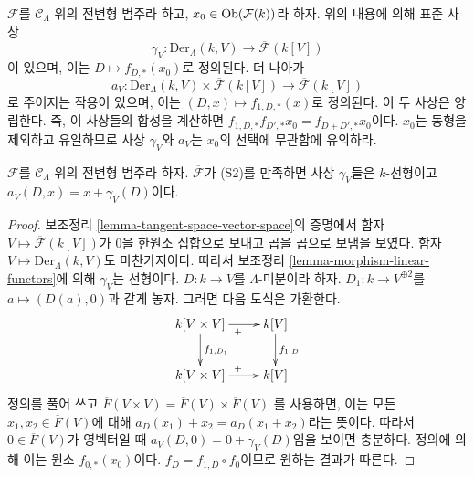 \medskip\noindent
$\mathcal{F}$를 $\mathcal{C}_\Lambda$ 위의 전변형 범주라 하고,
$x_0 \in \mathop{\mathrm{Ob}}\nolimits(\mathcal{F}(k))$라 하자. 위의 내용에 의해 표준 사상
$$
\gamma_V :
\text{Der}_\Lambda(k, V)
\longrightarrow
\overline{\mathcal{F}}(k[V])
$$
이 있으며, 이는 $D \mapsto f_{D, *}(x_0)$로 정의된다.
더 나아가
$$
a_V : \text{Der}_\Lambda(k, V) \times \overline{\mathcal{F}}(k[V])
\longrightarrow
\overline{\mathcal{F}}(k[V])
$$
로 주어지는 작용이 있으며, 이는
$(D, x) \mapsto f_{1, D, *}(x)$로 정의된다. 이 두 사상은
양립한다. 즉, 이 사상들의 합성을 계산하면
$f_{1, D, *}f_{D', *}x_0 = f_{D + D', *}x_0$이다.
$x_0$는 동형을 제외하고 유일하므로 사상 $\gamma_V$와
$a_V$는 $x_0$의 선택에 무관함에 유의하라.

\begin{lemma}
\label{lemma-action-linear}
$\mathcal{F}$를 $\mathcal{C}_\Lambda$ 위의 전변형 범주라 하자.
$\overline{\mathcal{F}}$가 (S2)를 만족하면 사상 $\gamma_V$들은
$k$-선형이고 $a_V(D, x) = x + \gamma_V(D)$이다.
\end{lemma}

\begin{proof}
보조정리 \ref{lemma-tangent-space-vector-space}의 증명에서
함자 $V \mapsto \overline{\mathcal{F}}(k[V])$가 $0$을 한원소
집합으로 보내고 곱을 곱으로 보냄을 보였다.
함자 $V \mapsto \text{Der}_\Lambda(k, V)$도 마찬가지이다.
따라서 보조정리 \ref{lemma-morphism-linear-functors}에 의해
$\gamma_V$는 선형이다.
$D : k \to V$를 $\Lambda$-미분이라 하자.
$D_1 : k \to V^{\oplus 2}$를 $a \mapsto (D(a), 0)$과 같게 놓자.
그러면 다음 도식은 가환한다.
$$
\xymatrix{
k[V \times V] \ar[r]_{+} \ar[d]^{f_{1, D_1}} & k[V] \ar[d]^{f_{1, D}} \\
k[V \times V] \ar[r]^{+} & k[V]
}
$$
정의를 풀어 쓰고
$\overline{F}(V \times V) = \overline{F}(V) \times \overline{F}(V)$
를 사용하면, 이는 모든
$x_1, x_2 \in \overline{F}(V)$에 대해
$a_D(x_1) + x_2 = a_D(x_1 + x_2)$라는 뜻이다.
따라서 $0 \in \overline{F}(V)$가 영벡터일 때
$a_V(D, 0) = 0 + \gamma_V(D)$임을 보이면 충분하다.
정의에 의해 이는 원소 $f_{0, *}(x_0)$이다.
$f_D = f_{1, D} \circ f_0$이므로 원하는 결과가 따른다.
\end{proof}

